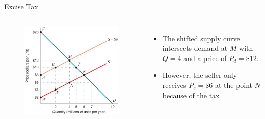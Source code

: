 \documentclass[11pt,t]{beamer}
\begin{document}
\begin{frame}{Excise Tax}
  \begin{columns}[T]
    \vspace{0pt}
    \begin{column}{.55\textwidth}
      \begin{figure}
        \includegraphics[width=\textwidth]{figures/fig10_2.jpg}
      \end{figure}

      \vspace*{50mm} %
    \end{column}
    
    \hfill
    
    \begin{column}{.45\textwidth}
      {\color{accent}\rule{\linewidth}{2pt}}

      \begin{itemize}
        \item The shifted supply curve intersects demand at $M$ with $Q = 4$ and a price of $P_d = \$12$. 
        \item However, the seller only receives $P_s = \$6$ at the point $N$ because of the tax
      \end{itemize}
    \end{column}
  \end{columns}
\end{frame}
\end{document}
